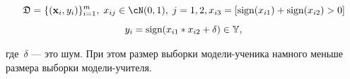 \documentclass[12pt, twoside]{article}
\begin{document}
$$\fD = \{(\bx_i, y_i)\}_{i=1}^{m},\; x_{ij} \in \cN(0, 1),\; j=1, 2, x_{i3} = [\text{sign}(x_{i1})+\text{sign}(x_{i2})>0]$$
$$y_i = \text{sign}(x_{i1}*x_{i2}+\delta) \in \mathbb{Y},$$

\noindent
где~$\delta$ --- это шум. При этом размер выборки модели-ученика намного меньше размера выборки модели-учителя.


\begin{figure}[!ht]
\begin{minipage}[h]{0.5\linewidth}
\end{minipage}
\begin{minipage}[h]{0.5\linewidth}

\end{minipage}
\end{figure}
\end{document}
